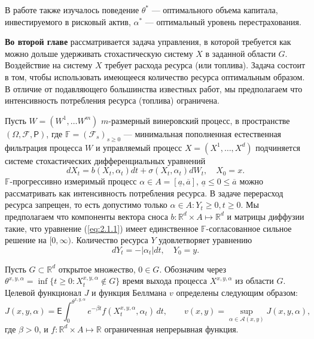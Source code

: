 \documentclass[twoside,12pt]{article}
\begin{document}
В работе также изучалось поведение $\theta^*$ --- оптимального объема капитала, инвестируемого в рисковый актив, $\alpha^*$ --- оптимальный уровень перестрахования.

\textbf{Во второй главе } рассматривается задача управления, в которой требуется как можно дольше удерживать стохастическую систему $X$ в заданной области $G$. Воздействие на систему $X$ требует расхода ресурса (или топлива). Задача состоит в том, чтобы использовать имеющееся количество ресурса оптимальным образом.
В отличие от подавляющего большинства известных работ, мы предполагаем что интенсивность потребления ресурса (топлива) ограничена.

Пусть $W=(W^1,\dots W^m)$ $m$-размерный винеровский процесс, в пространстве $(\Omega,\mathcal F,\mathsf P)$, где $\mathbb F=(\mathscr F_s)_{s\ge 0}$ --- минимальная пополненная естественная фильтрация процесса $W$ и управляемый процесс $X=(X^1,\dots,X^d)$ подчиняется системе стохастических дифференциальных уравнений
\begin{equation} \label{eq:2.1.1}
dX_t=b(X_t,\alpha_t) dt+\sigma(X_t,\alpha_t) dW_t, \quad X_0=x.
\end{equation}
$\mathbb F$-прогрессивно измеримый процесс $\alpha \in A=[\underline a, \overline a]$, $\underline a\le 0\le \overline a$ можно рассматривать как интенсивность потребления ресурса. В задаче перерасход ресурса запрещен, то есть допустимо только $\alpha \in A : Y_t \ge 0, t\ge 0$.  Мы предполагаем что компоненты вектора сноса $b:\mathbb R^d\times A\mapsto\mathbb R^d$ и матрицы диффузии такие, что уравнение (\ref{eq:2.1.1}) имеет единственное $\mathbb F$-согласованное сильное решение на $[0,\infty)$.
Количество ресурса $Y$ удовлетворяет уравнению
\begin{equation} \label{eq:2.1.2}
dY_t=-|\alpha_t|dt,\quad Y_0=y.
\end{equation}

Пусть $G\subset \mathbb R^d$ открытое множество, $0\in G$. Обозначим через
$\theta^{x,y,\alpha}=\inf\{t\ge 0:X_t^{x,y,\alpha}\not \in G\}$ время выхода процесса $X^{x,y,\alpha}$ из области $G$.
Целевой функционал $J$ и функция Беллмана $v$ определены следующим образом:
\begin{equation} \label{eq:2.1.3}
J(x,y,\alpha)=\mathsf E\int_0^{\theta^{x,y,\alpha}} e^{-\beta t} f(X_t^{x,y,\alpha},\alpha_t)\,dt, \qquad
   v(x,y)=\sup_{\alpha\in\mathcal A(x,y)} J(x,y,\alpha),
\end{equation}
где $\beta>0$, и $f:\mathbb R^d\times A\mapsto\mathbb R$ ограниченная непрерывная функция.
\end{document}

